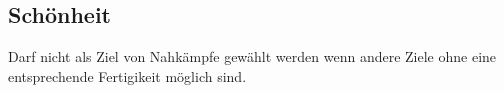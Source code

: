 \subsection{Schönheit}

Darf nicht als Ziel von Nahkämpfe gewählt werden wenn andere Ziele ohne eine entsprechende Fertigikeit möglich sind.